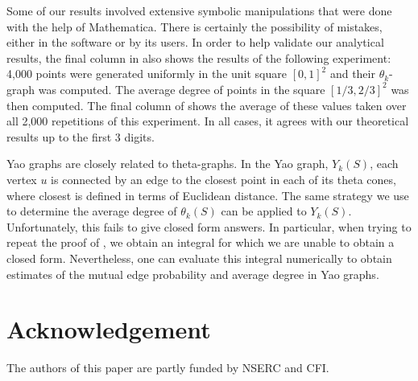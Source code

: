 \documentclass[twoside,leqno,twocolumn]{article}
\begin{document}
Some of our results involved extensive symbolic manipulations that were
done with the help of Mathematica.  There is certainly the possibility
of mistakes, either in the software or by its users.  In order to help
validate our analytical results, the final column in  also
shows the results of the following experiment: 4,000 points were generated
uniformly in the unit square $[0,1]^2$ and their $\theta_k$-graph was
computed.  The average degree of points in the square $[1/3,2/3]^2$ was
then computed.  The final column of  shows the average of
these values taken over all 2,000 repetitions of this experiment.  In all
cases, it agrees with our theoretical results up to the first 3 digits.

Yao graphs \cite{flinchbaugh.jones:strong,yao:on} are closely related to
theta-graphs.  In the Yao graph, $Y_k(S)$, each vertex $u$ is connected by
an edge to the closest point in each of its  theta cones, where closest
is defined in terms of Euclidean distance.  The same strategy we use to
determine the average degree of $\theta_k(S)$ can be applied to $Y_k(S)$.
Unfortunately, this fails to give closed form answers.  In particular,
when trying to repeat the proof of , we obtain an integral
for which we are unable to obtain a closed form.
Nevertheless, one can evaluate this integral numerically to obtain
estimates of the mutual edge probability and average degree in Yao graphs.

\section*{Acknowledgement}

The authors of this paper are partly funded by NSERC and CFI.



\end{document}
